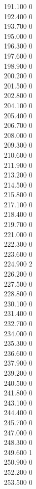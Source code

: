 { 191.100	0 \\
 192.400	0 \\
 193.700	0 \\
 195.000	0 \\
 196.300	0 \\
 197.600	0 \\
 198.900	0 \\
 200.200	0 \\
 201.500	0 \\
 202.800	0 \\
 204.100	0 \\
 205.400	0 \\
 206.700	0 \\
 208.000	0 \\
 209.300	0 \\
 210.600	0 \\
 211.900	0 \\
 213.200	0 \\
 214.500	0 \\
 215.800	0 \\
 217.100	0 \\
 218.400	0 \\
 219.700	0 \\
 221.000	0 \\
 222.300	0 \\
 223.600	0 \\
 224.900	2 \\
 226.200	0 \\
 227.500	0 \\
 228.800	0 \\
 230.100	0 \\
 231.400	0 \\
 232.700	0 \\
 234.000	0 \\
 235.300	0 \\
 236.600	0 \\
 237.900	0 \\
 239.200	0 \\
 240.500	0 \\
 241.800	0 \\
 243.100	0 \\
 244.400	0 \\
 245.700	0 \\
 247.000	0 \\
 248.300	0 \\
 249.600	1 \\
 250.900	0 \\
 252.200	0 \\
 253.500	0 \\
}
